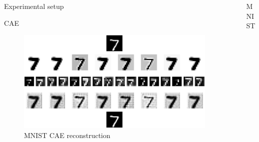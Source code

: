 \documentclass[final]{beamer}
\newlength{\sepwid}
\newlength{\onecolwid}
\newlength{\twocolwid}
\begin{document}
\begin{frame}[t]
\begin{columns}[t]
\begin{column}{\onecolwid}
\begin{block}{Experimental setup}
\end{block}


\begin{block}{CAE}
\begin{figure}
\includegraphics[width=0.8\linewidth]{graphics/feature_map_walkthrough_mnist.png}
\caption{MNIST CAE reconstruction}
\end{figure}
\end{block}


\end{column} %



\begin{column}{\sepwid}\end{column} %

\begin{column}{\onecolwid} %



\begin{block}{MNIST}




\end{block}
\end{column}
\end{columns}
\end{frame}
\end{document}
